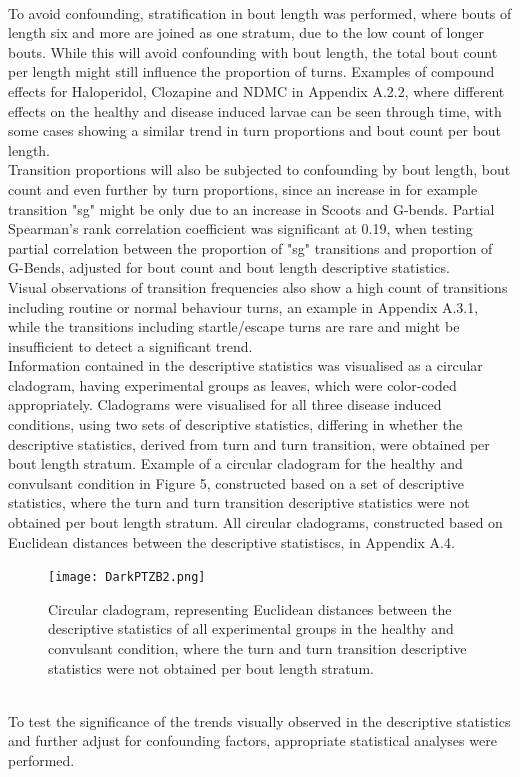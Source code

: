 \documentclass[a4paper,12pt]{article}
\begin{document}
\\To avoid confounding, stratification in bout length was performed, where bouts of length six and more are joined as one stratum, due to the low count of longer bouts.
While this will avoid confounding with bout length, the total bout count per length might still influence the proportion of turns. Examples of compound effects for Haloperidol, Clozapine and NDMC in Appendix A.2.2, where different effects on the healthy and disease induced larvae can be seen through time, with some cases showing a similar trend in turn proportions and bout count per bout length.
\\Transition proportions will also be subjected to confounding by bout length, bout count and even further by turn proportions, since an increase in for example transition "sg" might be only due to an increase in Scoots and G-bends. Partial Spearman's rank correlation coefficient was significant at 0.19, when testing partial correlation between the proportion of "sg" transitions and proportion of G-Bends, adjusted for bout count and bout length descriptive statistics. \\Visual observations of transition frequencies also show a high count of transitions including routine or normal behaviour turns, an example in Appendix A.3.1, while the transitions including startle/escape turns are rare and might be insufficient to detect a significant trend.
\\Information contained in the descriptive statistics was  visualised as a circular cladogram, having experimental groups as leaves, which were color-coded appropriately. Cladograms were  visualised for all three disease induced conditions, using two sets of descriptive statistics, differing in whether the descriptive statistics, derived from turn and turn transition, were obtained per bout length stratum. Example of a circular cladogram for the healthy and convulsant condition in Figure 5, constructed based on a set of descriptive statistics, where the turn and turn transition descriptive statistics were not obtained per bout length stratum. All circular cladograms, constructed based on Euclidean distances between the descriptive statistiscs, in Appendix A.4. 
\begin{figure}[h!]
\begin{center}
\texttt{[image: DarkPTZB2.png]}
\caption{Circular cladogram, representing Euclidean distances between the descriptive statistics of all experimental groups in the healthy and convulsant condition, where the turn and turn transition descriptive statistics were not obtained per bout length stratum.}
\end{center}
\end{figure}
\\To test the significance of the trends visually observed in the descriptive statistics and further adjust for confounding factors, appropriate statistical analyses were performed.
\end{document}
